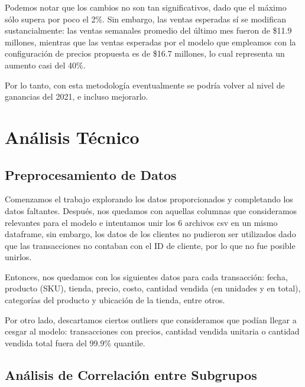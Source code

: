 \documentclass[12pt,a4paper]{article}
\begin{document}
Podemos notar que los cambios no son tan significativos, dado que el máximo sólo supera por poco el 2\%. Sin embargo, 
las ventas esperadas sí se modifican sustancialmente: las ventas semanales promedio del último mes fueron de \$11.9 millones, 
mientras que las ventas esperadas por el modelo que empleamos con la configuración de precios propuesta es de \$16.7 millones, lo cual 
representa un aumento casi del 40\%. 

Por lo tanto, con esta metodología eventualmente se podría volver al nivel de ganancias del 2021, e incluso mejorarlo.










\newpage

\section{Análisis Técnico}

\subsection{Preprocesamiento de Datos}

Comenzamos el trabajo explorando los datos proporcionados y completando los datos faltantes. Después, nos quedamos con aquellas 
columnas que consideramos relevantes para el modelo e intentamos unir los 6 archivos csv en un mismo dataframe, sin embargo, 
los datos de los clientes no pudieron ser utilizados dado que las transacciones no contaban con el ID de cliente, por lo que no 
fue posible unirlos. 

\vspace{0.2cm}

Entonces, nos quedamos con los siguientes datos para cada transacción: fecha, producto (SKU), tienda, 
precio, costo, cantidad vendida (en unidades y en total), categorías del producto y ubicación de la tienda, entre otros.

\vspace{0.2cm}

Por otro lado, descartamos ciertos outliers que consideramos que podían llegar a cesgar al modelo: transacciones con precios, 
cantidad vendida unitaria o cantidad vendida total fuera del 99.9\% quantile.

\vspace{0.2cm}

\subsection{Análisis de Correlación entre Subgrupos}
\end{document}
